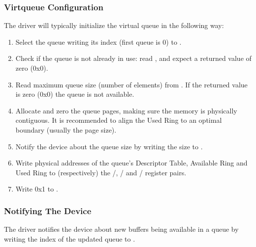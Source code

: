 \subsubsection{Virtqueue Configuration}\label{sec:Virtio Transport Options / Virtio Over MMIO / MMIO-specific Initialization And Device Operation / Virtqueue Configuration}

The driver will typically initialize the virtual queue in the following way:

\begin{enumerate}
\item Select the queue writing its index (first queue is 0) to
   .

\item Check if the queue is not already in use: read ,
   and expect a returned value of zero (0x0).

\item Read maximum queue size (number of elements) from
   . If the returned value is zero (0x0) the
   queue is not available.

\item Allocate and zero the queue pages, making sure the memory
   is physically contiguous. It is recommended to align the
   Used Ring to an optimal boundary (usually the page size).

\item Notify the device about the queue size by writing the size to
   .

\item Write physical addresses of the queue's Descriptor Table,
   Available Ring and Used Ring to (respectively) the
   /,
   / and
   / register pairs.

\item Write 0x1 to .
\end{enumerate}

\subsubsection{Notifying The Device}\label{sec:Virtio Transport Options / Virtio Over MMIO / MMIO-specific Initialization And Device Operation / Notifying The Device}

The driver notifies the device about new buffers being available in
a queue by writing the index of the updated queue to .


